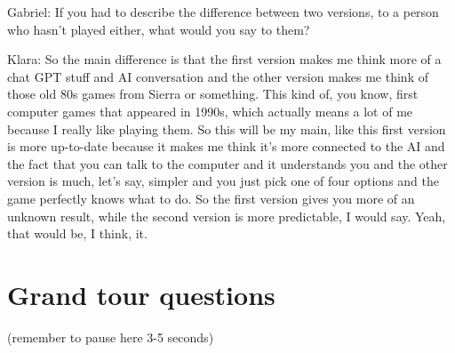 \begin{QandA}
\begin{answered}
               Gabriel: If you had to describe the difference between two versions, to a person who hasn't played either, what would you say to them?
           
               Klara: So the main difference is that the first version makes me think more of a chat GPT stuff and AI conversation and the other version makes me think of those old 80s games from Sierra or something.
               This kind of, you know, first computer games that appeared in 1990s, which actually means a lot of me because I really like playing them.
               So this will be my main, like this first version is more
               up-to-date because it makes me think it's more connected to the AI and the fact that you can talk to the computer and it understands you and the other version is much, let's say, simpler and you just pick one of four options and the game perfectly knows what to do.
               So the first version gives you more of an unknown result, while the second version is more predictable, I would say.
               Yeah, that would be, I think, it.
         \end{answered}
\end{QandA}




\section{Grand tour questions}
(remember to pause here 3-5 seconds)

